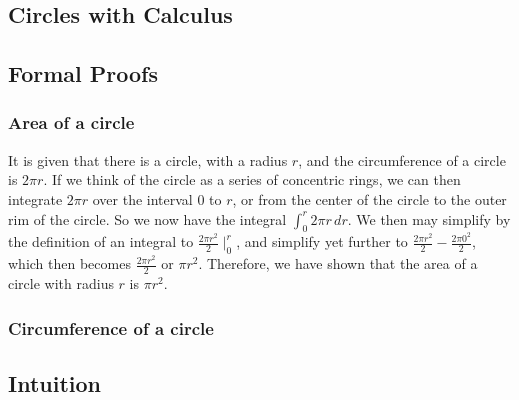 \documentclass[12pt]{article}
\begin{document}


\begin{appendices}
\section{Circles with Calculus}
\subsection{Formal Proofs}
\subsubsection{Area of a circle}
It is given that there is a circle, with a radius $r$, and the circumference of a circle is $2\pi r$. If we think of the circle as a series of concentric rings, we can then integrate $2\pi r$ over the interval $0$ to $r$, or from the center of the circle to the outer rim of the circle. So we now have the integral $\int^r_0 2\pi r\, dr$. We then may simplify by the definition of an integral to $\frac{2\pi r^2}{2}\mid^r_0$, and simplify yet further to $\frac{2\pi r^2}{2}-\frac{2\pi 0^2}{2}$, which then becomes $\frac{2\pi r^2}{2}$ or $\pi r^2$. Therefore, we have shown that the area of a circle with radius $r$ is $\pi r^2$.
\subsubsection{Circumference of a circle}
\subsection{Intuition}

\end{appendices}
\end{document}
